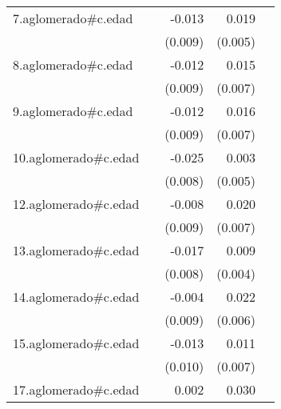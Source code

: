 {\begin{longtable}{l*{4}{D{.}{.}{-1}}}
\addlinespace
7.aglomerado#c.edad&                     &      -0.013         &       0.019\sym{***}&                     \\
            &                     &     (0.009)         &     (0.005)         &                     \\
\addlinespace
8.aglomerado#c.edad&                     &      -0.012         &       0.015\sym{*}  &                     \\
            &                     &     (0.009)         &     (0.007)         &                     \\
\addlinespace
9.aglomerado#c.edad&                     &      -0.012         &       0.016\sym{*}  &                     \\
            &                     &     (0.009)         &     (0.007)         &                     \\
\addlinespace
10.aglomerado#c.edad&                     &      -0.025\sym{**} &       0.003         &                     \\
            &                     &     (0.008)         &     (0.005)         &                     \\
\addlinespace
12.aglomerado#c.edad&                     &      -0.008         &       0.020\sym{**} &                     \\
            &                     &     (0.009)         &     (0.007)         &                     \\
\addlinespace
13.aglomerado#c.edad&                     &      -0.017\sym{*}  &       0.009\sym{*}  &                     \\
            &                     &     (0.008)         &     (0.004)         &                     \\
\addlinespace
14.aglomerado#c.edad&                     &      -0.004         &       0.022\sym{***}&                     \\
            &                     &     (0.009)         &     (0.006)         &                     \\
\addlinespace
15.aglomerado#c.edad&                     &      -0.013         &       0.011         &                     \\
            &                     &     (0.010)         &     (0.007)         &                     \\
\addlinespace
17.aglomerado#c.edad&                     &       0.002         &       0.030\sym{***}&                     \\

\end{longtable}}
